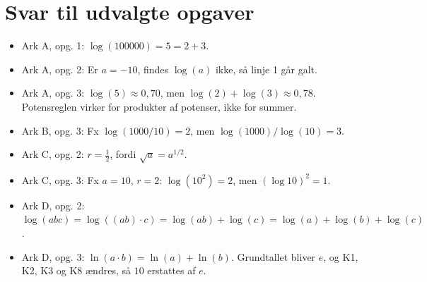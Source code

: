 \documentclass[a4paper,11pt]{article}
\begin{document}
\section*{Svar til udvalgte opgaver}
\label{sec:orgf981ba6}
\begin{itemize}
\item Ark A, opg. 1: \(\log(100000)=5=2+3\).
\item Ark A, opg. 2: Er \(a=-10\), findes \(\log(a)\) ikke, så linje 1 går galt.
\item Ark A, opg. 3: \(\log(5)\approx 0{,}70\), men \(\log(2)+\log(3)\approx 0{,}78\). Potensreglen virker for produkter af potenser, ikke for summer.
\item Ark B, opg. 3: Fx \(\log(1000/10)=2\), men \(\log(1000)/\log(10)=3\).
\item Ark C, opg. 2: \(r=\frac12\), fordi \(\sqrt a=a^{1/2}\).
\item Ark C, opg. 3: Fx \(a=10\), \(r=2\): \(\log(10^2)=2\), men \((\log 10)^2=1\).
\item Ark D, opg. 2: \(\log(abc)=\log((ab)\cdot c)=\log(ab)+\log(c)=\log(a)+\log(b)+\log(c)\).
\item Ark D, opg. 3: \(\ln(a\cdot b)=\ln(a)+\ln(b)\). Grundtallet bliver \(e\), og K1, K2, K3 og K8 ændres, så \(10\) erstattes af \(e\).
\end{itemize}
\end{document}
